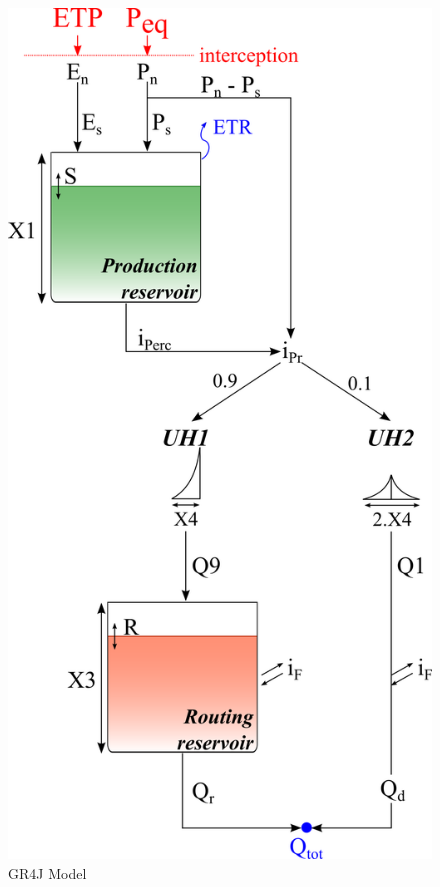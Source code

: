 \documentclass[
  letterpaper,
  DIV=11,
  numbers=noendperiod]{scrreprt}
\begin{document}
\begin{figure}

{\centering \includegraphics{./figures/fig-model_gr4j.png}

}

\caption{\label{fig-model_gr4j}GR4J Model}

\end{figure}
\end{document}
